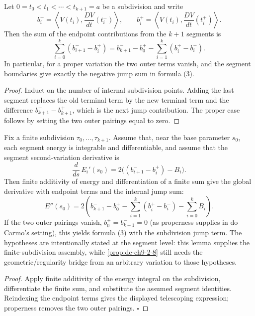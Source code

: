 \begin{lemma}
  \label{lem:dc-ch9-2-8-jump-sum}
  \leanok
  Let $0=t_0<t_1<\cdots<t_{k+1}=a$ be a subdivision and write
  \[
    b_i^- = \left\langle V(t_i),\frac{DV}{dt}(t_i^-)\right\rangle,
    \qquad
    b_i^+ = \left\langle V(t_i),\frac{DV}{dt}(t_i^+)\right\rangle.
  \]
  Then the sum of the endpoint contributions from the $k+1$ segments is
  \[
    \sum_{i=0}^k (b_{i+1}^- - b_i^+)
      = b_{k+1}^- - b_0^+ - \sum_{i=1}^k (b_i^+ - b_i^-).
  \]
  In particular, for a proper variation the two outer terms vanish, and the
  segment boundaries give exactly the negative jump sum in formula (3).
\end{lemma}
\begin{proof}
  \leanok
  Induct on the number of internal subdivision points.  Adding the last
  segment replaces the old terminal term by the new terminal term and the
  difference $b_{k+1}^- - b_{k+1}^+$, which is the next jump contribution.
  The proper case follows by setting the two outer pairings equal to zero.
\end{proof}

\begin{lemma}
  \label{lem:dc-ch9-2-8-piecewise-assembly}
  \leanok
  Fix a finite subdivision $\tau_0,\ldots,\tau_{k+1}$. Assume that, near the base
  parameter $s_0$, each segment energy is integrable and differentiable, and assume that
  the segment second-variation derivative is
  $$
  \frac{d}{ds}\,E_i'(s_0)=2\big((b^-_{i+1}-b^+_i)-B_i\big).
  $$
  Then finite additivity of energy and differentiation of a finite sum give the global
  derivative with endpoint terms and the internal jump sum:
  $$
  E''(s_0)=2\left(b^-_{k+1}-b^+_0-
    \sum_{i=1}^{k}(b^+_i-b^-_i)-\sum_{i=0}^{k}B_i\right).
  $$
  If the two outer pairings vanish, $b^+_0=b^-_{k+1}=0$ (as properness supplies
  in do Carmo's setting), this yields formula (3) with the subdivision jump term.
  The hypotheses are intentionally stated at the segment level:
  this lemma supplies the finite-subdivision assembly, while \cref{prop:dc-ch9-2-8} still
  needs the geometric/regularity bridge from an arbitrary variation to those hypotheses.
\end{lemma}
\begin{proof}
  \leanok
  Apply finite additivity of the energy integral on the subdivision, differentiate the finite
  sum, and substitute the assumed segment identities. Reindexing the endpoint terms gives
  the displayed telescoping expression; properness removes the two outer pairings. $\square$
\end{proof}

